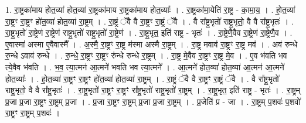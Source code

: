 \documentclass[17pt]{extarticle}
\begin{document}
1. रा॒ष्ट्रका॑माय होत॒व्या॑ होत॒व्या॑ रा॒ष्ट्रका॑माय रा॒ष्ट्रका॑माय होत॒व्याः᳚ । . रा॒ष्ट्रका॑मा॒येति॑ रा॒ष्ट्र - का॒मा॒य॒ । . हो॒त॒व्या॑ रा॒ष्ट्रꣳ रा॒ष्ट्रꣳ हो॑त॒व्या॑ होत॒व्या॑ रा॒ष्ट्रम् । . रा॒ष्ट्रं ॅवै वै रा॒ष्ट्रꣳ रा॒ष्ट्रं ॅवै । . वै रा᳚ष्ट्र॒भृतो॑ राष्ट्र॒भृतो॒ वै वै रा᳚ष्ट्र॒भृतः॑ । . रा॒ष्ट्र॒भृतो॑ रा॒ष्ट्रेण॑ रा॒ष्ट्रेण॑ राष्ट्र॒भृतो॑ राष्ट्र॒भृतो॑ रा॒ष्ट्रेण॑ । . रा॒ष्ट्र॒भृत॒ इति॑ राष्ट्र - भृतः॑ । . रा॒ष्ट्रेणै॒वैव रा॒ष्ट्रेण॑ रा॒ष्ट्रेणै॒व । . ए॒वास्मा॑ अस्मा ए॒वैवास्मै᳚ । . अ॒स्मै॒ रा॒ष्ट्रꣳ रा॒ष्ट्र म॑स्मा अस्मै रा॒ष्ट्रम् । . रा॒ष्ट्र मवाव॑ रा॒ष्ट्रꣳ रा॒ष्ट्र मव॑ । . अव॑ रुन्धे रु॒न्धे ऽवाव॑ रुन्धे । . रु॒न्धे॒ रा॒ष्ट्रꣳ रा॒ष्ट्रꣳ रु॑न्धे रुन्धे रा॒ष्ट्रम् । . रा॒ष्ट्र मे॒वैव रा॒ष्ट्रꣳ रा॒ष्ट्र मे॒व । . ए॒व भ॑वति भव त्ये॒वैव भ॑वति । . भ॒व॒ त्या॒त्मन॑ आ॒त्मने॑ भवति भव त्या॒त्मने᳚ । . आ॒त्मने॑ होत॒व्या॑ होत॒व्या॑ आ॒त्मन॑ आ॒त्मने॑ होत॒व्याः᳚ । . हो॒त॒व्या॑ रा॒ष्ट्रꣳ रा॒ष्ट्रꣳ हो॑त॒व्या॑ होत॒व्या॑ रा॒ष्ट्रम् । . रा॒ष्ट्रं ॅवै वै रा॒ष्ट्रꣳ रा॒ष्ट्रं ॅवै । . वै रा᳚ष्ट्र॒भृतो॑ राष्ट्र॒भृतो॒ वै वै रा᳚ष्ट्र॒भृतः॑ । . रा॒ष्ट्र॒भृतो॑ रा॒ष्ट्रꣳ रा॒ष्ट्रꣳ रा᳚ष्ट्र॒भृतो॑ राष्ट्र॒भृतो॑ रा॒ष्ट्रम् । . रा॒ष्ट्र॒भृत॒ इति॑ राष्ट्र - भृतः॑ । . रा॒ष्ट्रम् प्र॒जा प्र॒जा रा॒ष्ट्रꣳ रा॒ष्ट्रम् प्र॒जा । . प्र॒जा रा॒ष्ट्रꣳ रा॒ष्ट्रम् प्र॒जा प्र॒जा रा॒ष्ट्रम् । . प्र॒जेति॑ प्र - जा । . रा॒ष्ट्रम् प॒शवः॑ प॒शवो॑ रा॒ष्ट्रꣳ रा॒ष्ट्रम् प॒शवः॑ । \newline
\end{document}
